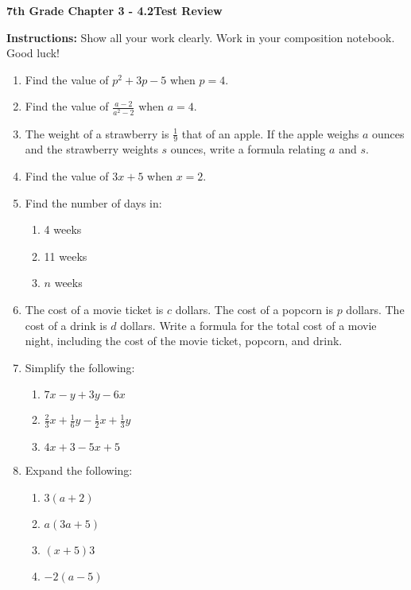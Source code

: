 \documentclass[11pt]{article}
\begin{document}
\begin{center}
    \textbf{\Large7th Grade Chapter 3 - 4.2Test Review}
\end{center}

\vspace{0.25in}

\textbf{Instructions:} Show all your work clearly.  Work in your composition notebook.  Good luck!

\begin{enumerate}
    \item Find the value of $p^2+3p-5$ when $p=4$.
    \item Find the value of $\frac{a-2}{a^2-2}$ when $a=4$.
    \item The weight of a strawberry is $\frac{1}{9}$ that of an apple. If the apple weighs $a$ ounces and the strawberry weights $s$ ounces, write a formula relating $a$ and $s$.
    \item Find the value of $3x+5$ when $x=2$.
    \item Find the number of days in:
    \begin{enumerate}
        \item 4 weeks
        \item 11 weeks
        \item $n$ weeks
    \end{enumerate}
    \item The cost of a movie ticket is $c$ dollars. The cost of a popcorn is $p$ dollars. The cost of a drink is $d$ dollars. Write a formula for the total cost of a movie night, including the cost of the movie ticket, popcorn, and drink.
    \item Simplify the following:
    \begin{enumerate}
        \item $7x-y+3y-6x$
        \item $\frac{2}{3}x + \frac{1}{6}y - \frac{1}{2}x + \frac{1}{3}y$
        \item $4x + 3 - 5x + 5$
    \end{enumerate}
    \item Expand the following:
    \begin{enumerate}
        \item $3(a+2)$
        \item $a(3a+5)$
        \item $(x+5)3$
        \item $-2(a-5)$
    \end{enumerate}
\end{enumerate}
\end{document}
